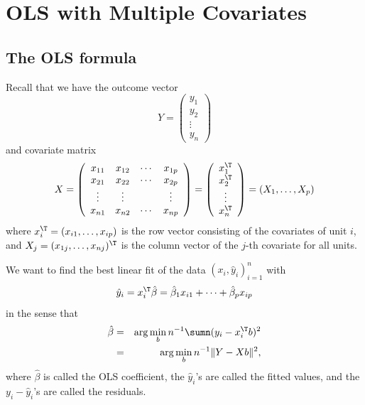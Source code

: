  
\chapter{OLS with Multiple Covariates}
 \label{chapter::ols-vector}

\section{The OLS formula}

Recall that we have the outcome vector
\[
Y=\left(\begin{array}{c}
y_{1}\\
y_{2}\\
\vdots\\
y_{n}
\end{array}\right)
\]
and covariate matrix
\[
 X=\left(\begin{array}{cccc}
x_{11} & x_{12} & \cdots & x_{1p}\\
x_{21} & x_{22} & \cdots & x_{2p}\\
\vdots & \vdots &  & \vdots\\
x_{n1} & x_{n2} & \cdots & x_{np}
\end{array}\right)=\left(\begin{array}{c}
x_{1}^{\T}\\
x_{2}^{\T}\\
\vdots\\
x_{n}^{\T}
\end{array}\right)
=(X_1,\ldots, X_p)
\]
where $x_{i}^{\T}=(x_{i1},\ldots,x_{ip})$ is the row vector consisting
of the covariates of unit $i$, and $X_j = (x_{1j}, \ldots, x_{nj})^{\T} $ is the column vector of the $j$-th covariate for all units. 


We want to find the best linear fit of the data
$
(x_{i}, \hat{y}_{i} )_{i=1}^{n}
$
with
$$
\hat{y}_{i}=x_{i}^{\T}\hat{\beta} = \hat{\beta}_1 x_{i1} + \cdots + \hat{\beta}_p x_{ip} 
$$
 in the sense that 
\begin{eqnarray*}
\hat{\beta} 
&=&\arg\min_{ b  }n^{-1}\sumn(y_{i}-x_{i}^{\T} b )^{2}\\
&=&\arg\min_{ b }n^{-1}\|Y-X b\|^{2},
\end{eqnarray*}
 where $\hat{\beta}$  is called the OLS coefficient, the $\hat{y}_{i}$'s are called the fitted values, and the $y_i-\hat{y}_{i}$'s are called the residuals. 

